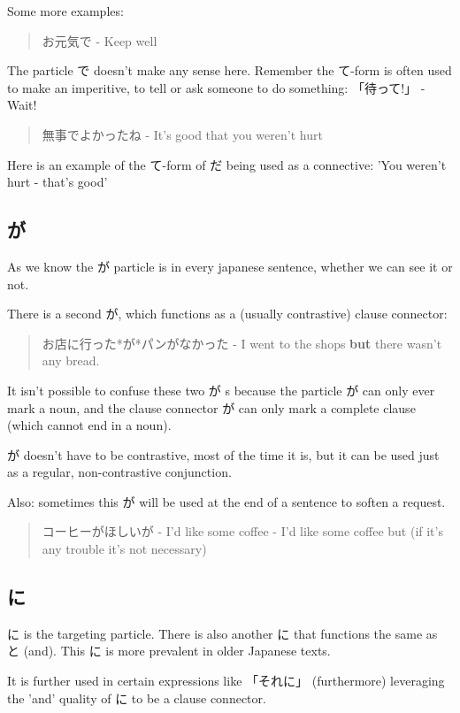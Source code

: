 \documentclass[11pt]{article}
\begin{document}
Some more examples:
\begin{quote}
お元気で - Keep well
\end{quote}
The particle で doesn't make any sense here. Remember the て-form is often used to make an imperitive, to tell or ask someone to do something: 「待って!」 - Wait!

\begin{quote}
無事でよかったね - It's good that you weren't hurt
\end{quote}
Here is an example of the て-form of だ being used as a connective: 'You weren't hurt - that's good'

\subsection{が}
\label{sec:orgaa776ee}
As we know the が particle is in every japanese sentence, whether we can see it or not.

There is a second が, which functions as a (usually contrastive) clause connector:
\begin{quote}
お店に行った*が*パンがなかった - I went to the shops \textbf{but} there wasn't any bread.
\end{quote}

It isn't possible to confuse these two が s because the particle が can only ever mark a noun, and the clause connector が can only mark a complete clause (which cannot end in a noun).

が doesn't have to be contrastive, most of the time it is, but it can be used just as a regular, non-contrastive conjunction.

Also: sometimes this が will be used at the end of a sentence to soften a request.
\begin{quote}
コーヒーがほしいが - I'd like some coffee - I'd like some coffee but (if it's any trouble it's not necessary)
\end{quote}

\subsection{に}
\label{sec:org91ae123}
に is the targeting particle. There is also another に that functions the same as と (and). This に is more prevalent in older Japanese texts.

It is further used in certain expressions like 「それに」 (furthermore) leveraging the 'and' quality of に to be a clause connector.
\end{document}
